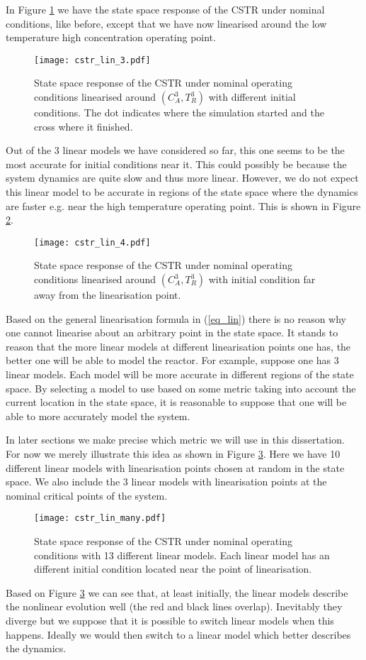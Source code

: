In Figure \ref{fig_cstr_lin_3} we have the state space response of the CSTR under nominal conditions, like before, except that we have now linearised around the low temperature high concentration operating point. 
\begin{figure}[H] 
\centering
\texttt{[image: cstr\_lin\_3.pdf]}
\caption{State space response of the CSTR under nominal operating conditions linearised around $(C_A^3,T_R^3)$ with different initial conditions. The dot indicates where the simulation started and the cross where it finished.}
\label{fig_cstr_lin_3}
\end{figure}
Out of the 3 linear models we have considered so far, this one seems to be the most accurate for initial conditions near it. This could possibly be because the system dynamics are quite slow and thus more linear. However, we do not expect this linear model to be accurate in regions of the state space where the dynamics are faster e.g. near the high temperature operating point. This is shown in Figure \ref{fig_cstr_lin_4}. 
\begin{figure}[H] 
\centering
\texttt{[image: cstr\_lin\_4.pdf]}
\caption{State space response of the CSTR under nominal operating conditions linearised around $(C_A^3,T_R^3)$ with initial condition far away from the linearisation point.}
\label{fig_cstr_lin_4}
\end{figure}
Based on the general linearisation formula in (\ref{eq_lin}) there is no reason why one cannot linearise about an arbitrary point in the state space. It stands to reason that the more linear models at different linearisation points one has, the better one will be able to model the reactor. For example, suppose one has 3 linear models. Each model will be more accurate in different regions of the state space. By selecting a model to use based on some metric taking into account the current location in the state space, it is reasonable to suppose that one will be able to more accurately model the system. 

In later sections we make precise which metric we will use in this dissertation. For now we merely illustrate this idea as shown in Figure \ref{fig_cstr_many}. Here we have 10 different linear models with linearisation points chosen at random in the state space. We also include the 3 linear models with linearisation points at the nominal critical points of the system. 
\begin{figure}[H] 
\centering
\texttt{[image: cstr\_lin\_many.pdf]}
\caption{State space response of the CSTR under nominal operating conditions with 13 different linear models. Each linear model has an different initial condition located near the point of linearisation.}
\label{fig_cstr_many}
\end{figure}
Based on Figure \ref{fig_cstr_many} we can see that, at least initially, the linear models describe the nonlinear evolution well (the red and black lines overlap). Inevitably they diverge but we suppose that it is possible to switch linear models when this happens. Ideally we would then switch to a linear model which better describes the dynamics. 

